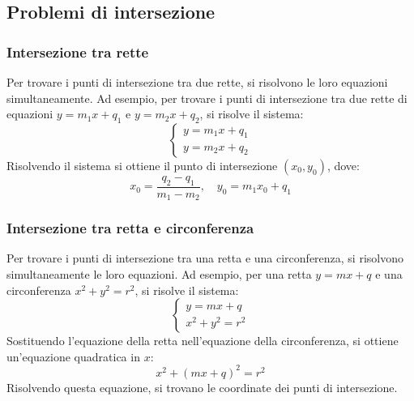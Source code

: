 \documentclass{article}
\begin{document}

\newpage
\subsection{Problemi di intersezione}

\subsubsection{Intersezione tra rette}
Per trovare i punti di intersezione tra due rette, si risolvono le loro equazioni
simultaneamente. Ad esempio, per trovare i punti di intersezione tra due rette di equazioni
\(y = m_1x + q_1\) e \(y = m_2x + q_2\), si risolve il sistema:
\[
    \begin{cases}
    y = m_1x + q_1 \\
    y = m_2x + q_2
    \end{cases}
\]
Risolvendo il sistema si ottiene il punto di intersezione \((x_0, y_0)\), dove:
\[
    x_0 = \frac{q_2 - q_1}{m_1 - m_2}, \quad y_0 = m_1x_0 + q_1
\]


\subsubsection{Intersezione tra retta e circonferenza}
Per trovare i punti di intersezione tra una retta e una circonferenza, si risolvono
simultaneamente le loro equazioni. Ad esempio, per una retta \(y = mx + q\) e una
circonferenza \(x^2 + y^2 = r^2\), si risolve il sistema:
\[
    \begin{cases}
    y = mx + q \\
    x^2 + y^2 = r^2
    \end{cases}
\]
Sostituendo l'equazione della retta nell'equazione della circonferenza, si ottiene
un'equazione quadratica in \(x\):
\[
    x^2 + (mx + q)^2 = r^2
\]
Risolvendo questa equazione, si trovano le coordinate dei punti di intersezione.
\end{document}

